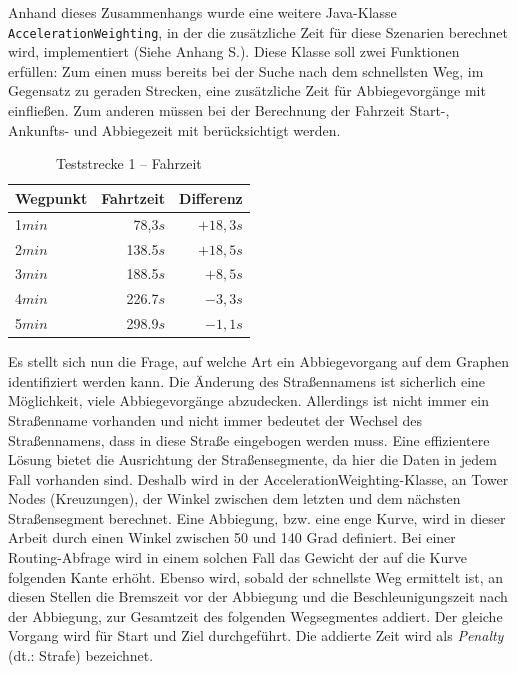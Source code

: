 Anhand dieses Zusammenhangs wurde eine weitere Java-Klasse \texttt{AccelerationWeighting}, in der die zusätzliche Zeit für diese Szenarien berechnet wird, implementiert (Siehe Anhang S.\pageref{sec:source}).
Diese Klasse soll zwei Funktionen erfüllen:
Zum einen muss bereits bei der Suche nach dem schnellsten Weg, im Gegensatz zu geraden Strecken, eine zusätzliche Zeit für Abbiegevorgänge mit einfließen.
Zum anderen müssen bei der Berechnung der Fahrzeit Start-, Ankunfts- und Abbiegezeit mit berücksichtigt werden.

\begin{table}[htb]
\centering
\caption{Teststrecke 1 -- Fahrzeit}
\label{tab:drive11}
\begin{tabular}{|l|r|r|}
\hline
Wegpunkt & Fahrtzeit & Differenz \\ \hline 
1$min$ & 78,3$s$ & $+18,3s$ \\
2$min$ & 138.5$s$ & $+18,5s$ \\
3$min$ & 188.5$s$ & $+8,5s$ \\
4$min$ & 226.7$s$ & $-3,3s$ \\
5$min$ & 298.9$s$ & $-1,1s$ \\
\hline
\end{tabular}
\end{table}

Es stellt sich nun die Frage, auf welche Art ein Abbiegevorgang auf dem Graphen identifiziert werden kann.
Die Änderung des Straßennamens ist sicherlich eine Möglichkeit, viele Abbiegevorgänge abzudecken.
Allerdings ist nicht immer ein Straßenname vorhanden und nicht immer bedeutet der Wechsel des Straßennamens, dass in diese Straße eingebogen werden muss.
Eine effizientere Lösung bietet die Ausrichtung der Straßensegmente, da hier die Daten in jedem Fall vorhanden sind.
Deshalb wird in der AccelerationWeighting-Klasse, an Tower Nodes (Kreuzungen), der Winkel zwischen dem letzten und dem nächsten Straßensegment berechnet.
Eine Abbiegung, bzw. eine enge Kurve, wird in dieser Arbeit durch einen Winkel zwischen 50 und 140 Grad definiert.
Bei einer Routing-Abfrage wird in einem solchen Fall das Gewicht der auf die Kurve folgenden Kante erhöht.
Ebenso wird, sobald der schnellste Weg ermittelt ist, an diesen Stellen die Bremszeit vor der Abbiegung und die Beschleunigungszeit nach der Abbiegung, zur Gesamtzeit des folgenden Wegsegmentes addiert.
Der gleiche Vorgang wird für Start und Ziel durchgeführt.
Die addierte Zeit wird als \textit{Penalty} (dt.: Strafe) bezeichnet.

